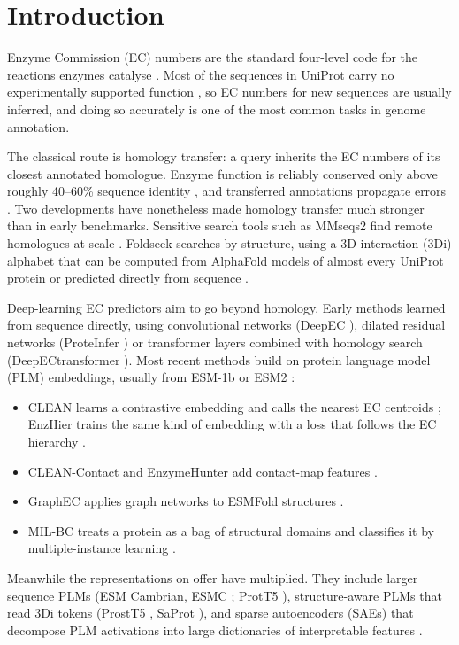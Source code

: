\documentclass[11pt]{article}
\begin{document}
\section{Introduction}

Enzyme Commission (EC) numbers are the standard four-level code for the reactions enzymes catalyse
\cite{mcdonald2023}. Most of the sequences in UniProt carry no experimentally supported function \cite{uniprot2025},
so EC numbers for new sequences are usually inferred, and doing so accurately is one of the most common tasks in
genome annotation.

The classical route is homology transfer: a query inherits the EC numbers of its closest annotated homologue.
Enzyme function is reliably conserved only above roughly 40--60\% sequence identity \cite{rost2002,tian2003}, and
transferred annotations propagate errors \cite{schnoes2009}. Two developments have nonetheless made homology transfer
much stronger than in early benchmarks. Sensitive search tools such as MMseqs2 find remote homologues at scale
\cite{mmseqs2}. Foldseek searches by structure, using a 3D-interaction (3Di) alphabet \cite{foldseek} that can be
computed from AlphaFold models of almost every UniProt protein \cite{jumper2021,afdb2022} or predicted directly from
sequence \cite{prostt5}.

Deep-learning EC predictors aim to go beyond homology. Early methods learned from sequence directly, using
convolutional networks (DeepEC \cite{deepec}), dilated residual networks (ProteInfer \cite{proteinfer}) or
transformer layers combined with homology search (DeepECtransformer \cite{deepectransformer}). Most recent methods
build on protein language model (PLM) embeddings, usually from ESM-1b or ESM2 \cite{esm1b,esm2}:
\begin{itemize}
  \item CLEAN learns a contrastive embedding and calls the nearest EC centroids \cite{clean}; EnzHier trains the same
        kind of embedding with a loss that follows the EC hierarchy \cite{enzhier}.
  \item CLEAN-Contact and EnzymeHunter add contact-map features \cite{cleancontact,enzymehunter}.
  \item GraphEC applies graph networks to ESMFold structures \cite{graphec}.
  \item MIL-BC treats a protein as a bag of structural domains and classifies it by multiple-instance learning
        \cite{milbc,dctdomain,ilse2018}.
\end{itemize}
Meanwhile the representations on offer have multiplied. They include larger sequence PLMs (ESM Cambrian, ESMC
\cite{esmc}; ProtT5 \cite{prottrans}), structure-aware PLMs that read 3Di tokens (ProstT5 \cite{prostt5}, SaProt
\cite{saprot}), and sparse autoencoders (SAEs) that decompose PLM activations into large dictionaries of interpretable
features \cite{gao2024sae,interplm,biohubsae}.
\end{document}
